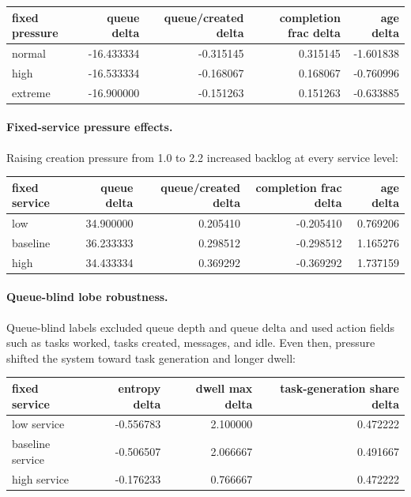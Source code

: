 \documentclass[11pt]{article}
\begin{document}
\begin{center}
\begin{tabular}{lrrrr}
fixed pressure & queue delta & queue/created delta & completion frac delta & age delta \\
\hline
normal & -16.433334 & -0.315145 & 0.315145 & -1.601838 \\
high & -16.533334 & -0.168067 & 0.168067 & -0.760996 \\
extreme & -16.900000 & -0.151263 & 0.151263 & -0.633885
\end{tabular}
\end{center}

\paragraph{Fixed-service pressure effects.}
Raising creation pressure from 1.0 to 2.2 increased backlog at every service
level:

\begin{center}
\begin{tabular}{lrrrr}
fixed service & queue delta & queue/created delta & completion frac delta & age delta \\
\hline
low & 34.900000 & 0.205410 & -0.205410 & 0.769206 \\
baseline & 36.233333 & 0.298512 & -0.298512 & 1.165276 \\
high & 34.433334 & 0.369292 & -0.369292 & 1.737159
\end{tabular}
\end{center}

\paragraph{Queue-blind lobe robustness.}
Queue-blind labels excluded queue depth and queue delta and used action fields
such as tasks worked, tasks created, messages, and idle. Even then, pressure
shifted the system toward task generation and longer dwell:

\begin{center}
\begin{tabular}{lrrr}
fixed service & entropy delta & dwell max delta & task-generation share delta \\
\hline
low service & -0.556783 & 2.100000 & 0.472222 \\
baseline service & -0.506507 & 2.066667 & 0.491667 \\
high service & -0.176233 & 0.766667 & 0.472222
\end{tabular}
\end{center}
\end{document}
